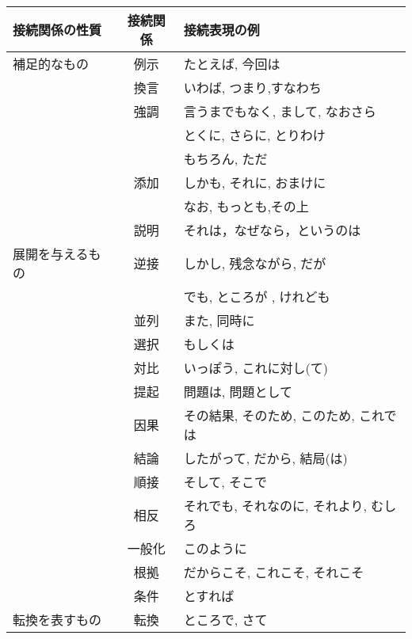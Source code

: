 
\vspace*{1em}
\begin{tabular}{|l|c|l|}
\hline
接続関係の性質 & 接続関係 & 接続表現の例\\
\hline \hline
補足的なもの & 例示 & たとえば, 今回は\\ \cline{2-3}
            & 換言 & いわば, つまり,すなわち\\ \cline{2-3}
            & 強調 & 言うまでもなく,  まして, なおさら\\
            &      & とくに, さらに, とりわけ\\
            &      & もちろん, ただ\\ \cline{2-3}
            & 添加 &しかも, それに, おまけに\\
            &      & なお, もっとも,その上\\ \cline{2-3}
            & 説明 & それは，なぜなら，というのは \\ \hline
展開を与えるもの &逆接 & しかし, 残念ながら, だが\\
                &      & でも, ところが , けれども\\ \cline{2-3}
                & 並列 & また, 同時に\\ \cline{2-3}
                & 選択 & もしくは\\ \cline{2-3}
                & 対比 & いっぽう, これに対し(て) \\ \cline{2-3}
                & 提起 & 問題は, 問題として\\ \cline{2-3}
                & 因果 & その結果, そのため, このため, これでは\\ \cline{2-3}
                & 結論 & したがって, だから, 結局(は)\\ \cline{2-3}
                & 順接 & そして, そこで\\ \cline{2-3}
                & 相反 & それでも, それなのに, それより, むしろ\\ \cline{2-3}
                & 一般化 & このように\\ \cline{2-3}
                & 根拠 & だからこそ, これこそ, それこそ\\ \cline{2-3}
                & 条件 & とすれば\\ \hline
転換を表すもの & 転換 & ところで, さて\\ \hline
\end{tabular}\\

